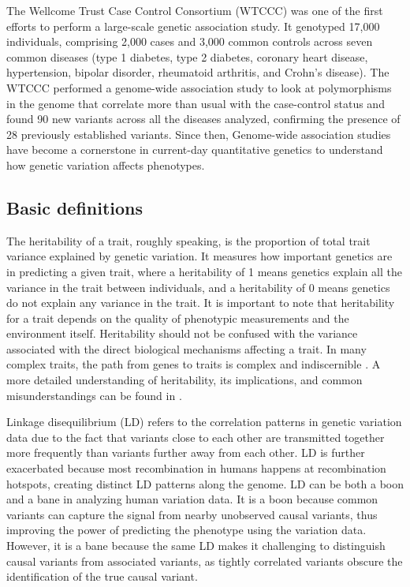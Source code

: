 The Wellcome Trust Case Control Consortium (WTCCC) \cite{WTCCC2007} was one of the first efforts to perform a large-scale genetic association study. It genotyped 17,000 individuals, comprising 2,000 cases and 3,000 common controls across seven common diseases (type 1 diabetes, type 2 diabetes, coronary heart disease, hypertension, bipolar disorder, rheumatoid arthritis, and Crohn's disease). The WTCCC performed a genome-wide association study to look at polymorphisms in the genome that correlate more than usual with the case-control status and found 90 new variants across all the diseases analyzed, confirming the presence of 28 previously established variants. Since then, Genome-wide association studies have become a cornerstone in current-day quantitative genetics to understand how genetic variation affects phenotypes.


\subsection{Basic definitions}

The heritability of a trait, roughly speaking, is the proportion of total trait variance explained by genetic variation. It measures how important genetics are in predicting a given trait, where a heritability of 1 means genetics explain all the variance in the trait between individuals, and a heritability of 0 means genetics do not explain any variance in the trait. It is important to note that heritability for a trait depends on the quality of phenotypic measurements and the environment itself. Heritability should not be confused with the variance associated with the direct biological mechanisms affecting a trait. In many complex traits, the path from genes to traits is complex and indiscernible \cite{Neale2017}. A more detailed understanding of heritability, its implications, and common misunderstandings can be found in \cite{Visscher2008,Gusev2021}.

Linkage disequilibrium (LD) refers to the correlation patterns in genetic variation data due to the fact that variants close to each other are transmitted together more frequently than variants further away from each other. LD is further exacerbated because most recombination in humans happens at recombination hotspots, creating distinct LD patterns along the genome. LD can be both a boon and a bane in analyzing human variation data. It is a boon because common variants can capture the signal from nearby unobserved causal variants, thus improving the power of predicting the phenotype using the variation data. However, it is a bane because the same LD makes it challenging to distinguish causal variants from associated variants, as tightly correlated variants obscure the identification of the true causal variant.

